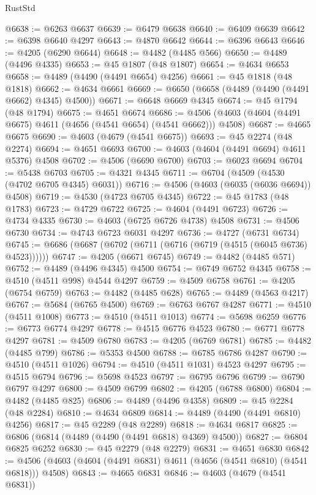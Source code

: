 \begin{lexlean}{RustStd}
\begin{coremodule}
@6638 := @6263 @6637
@6639 := @6479 @6638
@6640 := @6409 @6639
@6642 := @6398 @6640 @4297
@6643 := @4870 @6642
@6644 := @6396 @6643
@6646 := @4205 (@6290 @6644)
@6648 := @4482 (@4485 @566)
@6650 := @4489 (@4496 @4335)
@6653 := @45 @1807 (@48 @1807)
@6654 := @4634 @6653
@6658 := @4489 (@4490 (@4491 @6654) @4256)
@6661 := @45 @1818 (@48 @1818)
@6662 := @4634 @6661
@6669 := @6650 (@6658 (@4489 (@4490 (@4491 @6662) @4345) @4500))
@6671 := @6648 @6669 @4345
@6674 := @45 @1794 (@48 @1794)
@6675 := @4651 @6674
@6686 := @4506 (@4603 (@4604 (@4491 @6675) @4611 (@4656 (@4541 @6654) (@4541 @6662))) @4508)
@6687 := @4665 @6675
@6690 := @4603 (@4679 (@4541 @6675))
@6693 := @45 @2274 (@48 @2274)
@6694 := @4651 @6693
@6700 := @4603 (@4604 (@4491 @6694) @4611 @5376) @4508
@6702 := @4506 (@6690 @6700)
@6703 := @6023 @6694
@6704 := @5438 @6703
@6705 := @4321 @4345
@6711 := @6704 (@4509 (@4530 (@4702 @6705 @4345) @6031))
@6716 := @4506 (@4603 (@6035 (@6036 @6694)) @4508)
@6719 := @4530 (@4723 @6705 @4345)
@6722 := @45 @1783 (@48 @1783)
@6723 := @4729 @6722
@6725 := @4604 (@4491 @6723)
@6726 := @4734 @4335
@6730 := @4603 (@6725 @6726 @4738) @4508
@6731 := @4506 @6730
@6734 := @4743 @6723 @6031 @4297
@6736 := @4727 (@6731 @6734)
@6745 := @6686 (@6687 (@6702 (@6711 (@6716 (@6719 (@4515 (@6045 @6736) @4523))))))
@6747 := @4205 (@6671 @6745)
@6749 := @4482 (@4485 @571)
@6752 := @4489 (@4496 @4345) @4500
@6754 := @6749 @6752 @4345
@6758 := @4510 (@4511 @998) @4544 @4297
@6759 := @4509 @6758
@6761 := @4205 (@6754 @6759)
@6763 := @4482 (@4485 @628)
@6765 := @4489 (@4563 @4217)
@6767 := @5684 (@6765 @4500)
@6769 := @6763 @6767 @4287
@6771 := @4510 (@4511 @1008)
@6773 := @4510 (@4511 @1013)
@6774 := @5698 @6259
@6776 := @6773 @6774 @4297
@6778 := @4515 @6776 @4523
@6780 := @6771 @6778 @4297
@6781 := @4509 @6780
@6783 := @4205 (@6769 @6781)
@6785 := @4482 (@4485 @799)
@6786 := @5353 @4500
@6788 := @6785 @6786 @4287
@6790 := @4510 (@4511 @1026)
@6794 := @4510 (@4511 @1031) @4523 @4297
@6795 := @4515 @6794
@6796 := @5698 @4523
@6797 := @6795 @6796
@6799 := @6790 @6797 @4297
@6800 := @4509 @6799
@6802 := @4205 (@6788 @6800)
@6804 := @4482 (@4485 @825)
@6806 := @4489 (@4496 @4358)
@6809 := @45 @2284 (@48 @2284)
@6810 := @4634 @6809
@6814 := @4489 (@4490 (@4491 @6810) @4256)
@6817 := @45 @2289 (@48 @2289)
@6818 := @4634 @6817
@6825 := @6806 (@6814 (@4489 (@4490 (@4491 @6818) @4369) @4500))
@6827 := @6804 @6825 @6252
@6830 := @45 @2279 (@48 @2279)
@6831 := @4651 @6830
@6842 := @4506 (@4603 (@4604 (@4491 @6831) @4611 (@4656 (@4541 @6810) (@4541 @6818))) @4508)
@6843 := @4665 @6831
@6846 := @4603 (@4679 (@4541 @6831))

\end{coremodule}
\end{lexlean}
